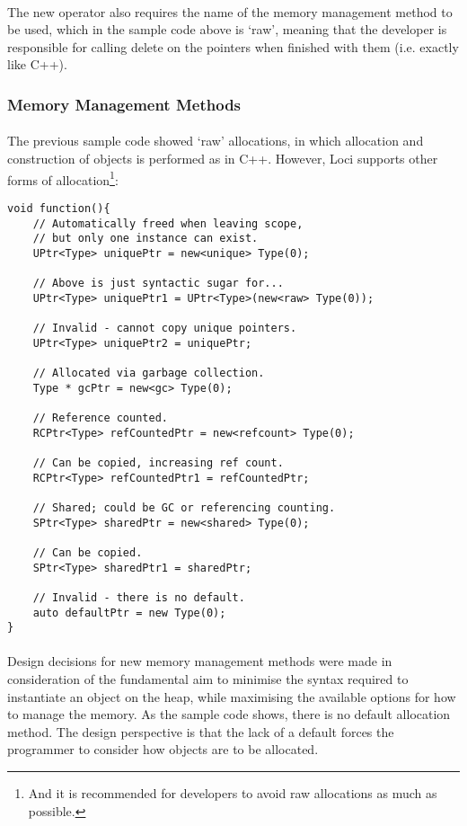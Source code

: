 \documentclass[12pt,twoside,notitlepage]{report}
\begin{document}
\paragraph{}
The new operator also requires the name of the memory management method to be used, which in the sample code above is `raw', meaning that the developer is responsible for calling delete on the pointers when finished with them (i.e. exactly like C++).

\clearpage

\subsubsection{Memory Management Methods}

\paragraph{}
The previous sample code showed `raw' allocations, in which allocation and construction of objects is performed as in C++. However, Loci supports other forms of allocation\footnote{And it is recommended for developers to avoid raw allocations as much as possible.}:


\begin{lstlisting}
void function(){
	// Automatically freed when leaving scope,
	// but only one instance can exist.
	UPtr<Type> uniquePtr = new<unique> Type(0);
	
	// Above is just syntactic sugar for...
	UPtr<Type> uniquePtr1 = UPtr<Type>(new<raw> Type(0));
	
	// Invalid - cannot copy unique pointers.
	UPtr<Type> uniquePtr2 = uniquePtr;
	
	// Allocated via garbage collection.
	Type * gcPtr = new<gc> Type(0);
	
	// Reference counted.
	RCPtr<Type> refCountedPtr = new<refcount> Type(0);
	
	// Can be copied, increasing ref count.
	RCPtr<Type> refCountedPtr1 = refCountedPtr;
	
	// Shared; could be GC or referencing counting.
	SPtr<Type> sharedPtr = new<shared> Type(0);
	
	// Can be copied.
	SPtr<Type> sharedPtr1 = sharedPtr;
	
	// Invalid - there is no default.
	auto defaultPtr = new Type(0);
}
\end{lstlisting}


\paragraph{}
Design decisions for new memory management methods were made in consideration of the fundamental aim to minimise the syntax required to instantiate an object on the heap, while maximising the available options for how to manage the memory. As the sample code shows, there is no default allocation method. The design perspective is that the lack of a default forces the programmer to consider how objects are to be allocated.
\end{document}
